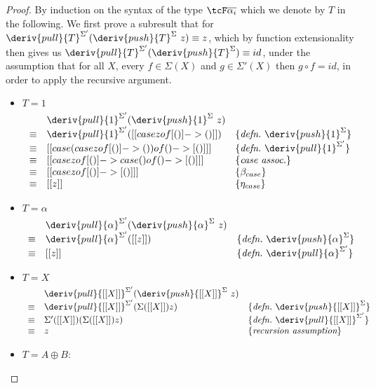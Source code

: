 \begin{proof}
By induction on the syntax of the type $\tcF \overline{\alpha_i}$ which we denote
by $T$ in the following. We first prove a subresult that for
$\deriv{pull}{T}^{\Sigma'}(\deriv{push}{T}^\Sigma \ z) \equiv z$, which by
function extensionality then gives us
$\deriv{pull}{T}^{\Sigma'}(\deriv{push}{T}^\Sigma) \equiv id$,
under the assumption that for all $X$, every $f \in \Sigma(X)$ and $g \in
\Sigma'(X)$ then $g \circ f = id$, in order to apply the recursive argument.
%
\begin{itemize}
\item $T = 1$
%
\begin{align*}
\begin{array}{rll}
       & \deriv{pull}{1}^{\Sigma'}(\deriv{push}{1}^\Sigma \ z) & \\
%
\equiv & \deriv{pull}{1}^{\Sigma'}([[ case z of [ () ] -> () ]])
& \{\textit{defn.}\ \deriv{push}{1}^\Sigma \} \\
%
\equiv & [[ case (case z of [ () ] -> () ) of () -> [ () ] ]]
& \{\textit{defn.}\ \deriv{pull}{1}^{\Sigma'}\} \\
%
\equiv & [[ case z of [()] -> case () of () -> [ () ] ]]
& \{\textit{case assoc.}\} \\
%
\equiv & [[ case z of [()] -> [ () ] ]]
& \{\beta_{case}\} \\
%
\equiv & [[ z ]]
& \{\textit{$\eta_{case}$}\}
\end{array}
\end{align*}
%

\item $T = \alpha$
%
\begin{align*}
\begin{array}{rll}
       & \deriv{pull}{\alpha}^{\Sigma'}(\deriv{push}{\alpha}^\Sigma \ z) & \\
%
\equiv & \deriv{pull}{\alpha}^{\Sigma'}([[ z ]])
& \{\textit{defn.}\ \deriv{push}{\alpha}^\Sigma  \} \\
%
\equiv & [[ z ]] & \{\textit{defn.}\ \deriv{pull}{\alpha}^{\Sigma'} \}
\end{array}
\end{align*}

\item $T = X$
%
\begin{align*}
\begin{array}{rll}
       & \deriv{pull}{[[ X ]]}^{\Sigma'}(\deriv{push}{[[ X ]]}^\Sigma \ z) & \\
\equiv & \deriv{pull}{[[ X ]]}^{\Sigma'}(\Sigma ([[ X ]]) z) & \{ \textit{defn.}\  \deriv{push}{[[ X ]]}^\Sigma \} \\
%
\equiv & \Sigma' ([[ X ]]) (\Sigma ([[X]]) z) & \{ \textit{defn.} \  \deriv{pull}{[[ X ]]}^{\Sigma'} \} \\
\equiv & z & \{ \textit{recursion assumption} \}
\end{array}
\end{align*}
\item $T = A \oplus B$:


\end{itemize}
\end{proof}
